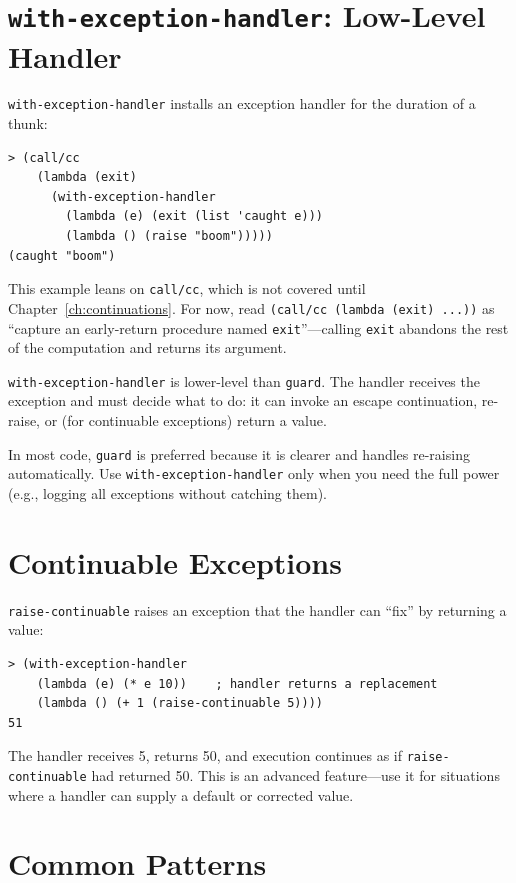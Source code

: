 \section{\texttt{with-exception-handler}: Low-Level Handler}

\texttt{with-exception-handler} installs an exception handler for the duration of a thunk:

\begin{lstlisting}[style=repl]
> (call/cc
    (lambda (exit)
      (with-exception-handler
        (lambda (e) (exit (list 'caught e)))
        (lambda () (raise "boom")))))
(caught "boom")
\end{lstlisting}

This example leans on \texttt{call/cc}, which is not covered until Chapter~\ref{ch:continuations}. For now, read \texttt{(call/cc (lambda (exit) ...))} as ``capture an early-return procedure named \texttt{exit}''---calling \texttt{exit} abandons the rest of the computation and returns its argument.

\texttt{with-exception-handler} is lower-level than \texttt{guard}. The handler receives the exception and must decide what to do: it can invoke an escape continuation, re-raise, or (for continuable exceptions) return a value.

In most code, \texttt{guard} is preferred because it is clearer and handles re-raising automatically. Use \texttt{with-exception-handler} only when you need the full power (e.g., logging all exceptions without catching them).

\section{Continuable Exceptions}

\texttt{raise-continuable} raises an exception that the handler can ``fix'' by returning a value:

\begin{lstlisting}[style=repl]
> (with-exception-handler
    (lambda (e) (* e 10))    ; handler returns a replacement
    (lambda () (+ 1 (raise-continuable 5))))
51
\end{lstlisting}

The handler receives 5, returns 50, and execution continues as if \texttt{raise-continuable} had returned 50. This is an advanced feature---use it for situations where a handler can supply a default or corrected value.

\section{Common Patterns}

